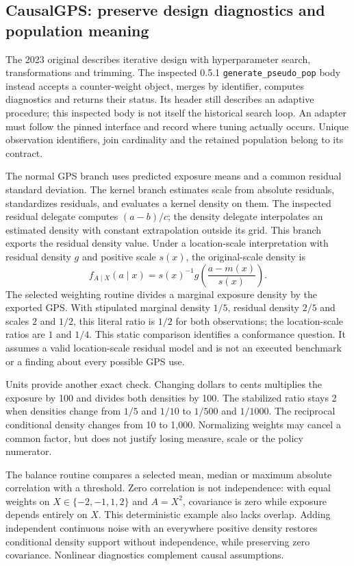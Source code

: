 \subsection{CausalGPS: preserve design diagnostics and population meaning}
The 2023 original describes iterative design with hyperparameter search,
transformations and trimming. The inspected 0.5.1
\texttt{generate\_pseudo\_pop} body instead accepts a counter-weight object,
merges by identifier, computes diagnostics and returns their status. Its header
still describes an adaptive procedure; this inspected body is not itself the
historical search loop. An adapter must follow the pinned interface and record
where tuning actually occurs. Unique observation identifiers, join cardinality
and the retained population belong to its contract.
\citep{exec24_dose_causalgps,exec24_dose_original}

The normal GPS branch uses predicted exposure means and a common residual
standard deviation. The kernel branch estimates scale from absolute residuals,
standardizes residuals, and evaluates a kernel density on them. The inspected
residual delegate computes $(a-b)/c$; the density delegate interpolates an
estimated density with constant extrapolation outside its grid. This branch
exports the residual density value. Under a location-scale interpretation with
residual density $g$ and positive scale $s(x)$, the original-scale density is
\[
 f_{A\mid X}(a\mid x)=s(x)^{-1}
 g\!\left(\frac{a-m(x)}{s(x)}\right).
\]
The selected weighting routine divides a marginal exposure density by the
exported GPS. With stipulated marginal density $1/5$, residual density $2/5$
and scales $2$ and $1/2$, this literal ratio is $1/2$ for both observations;
the location-scale ratios are $1$ and $1/4$. This static comparison identifies
a conformance question. It assumes a valid location-scale residual model and
is not an executed benchmark or a finding about every possible GPS use.
\citep{exec24_dose_causalgps,exec24_dose_contract}

Units provide another exact check. Changing dollars to cents multiplies the
exposure by 100 and divides both densities by 100. The stabilized ratio stays
2 when densities change from $1/5$ and $1/10$ to $1/500$ and $1/1000$.
The reciprocal conditional density changes from 10 to 1,000. Normalizing weights
may cancel a common factor, but does not justify losing measure, scale or the
policy numerator.~\citep{exec24_dose_contract}

The balance routine compares a selected mean, median or maximum absolute
correlation with a threshold. Zero correlation is not independence: with equal
weights on $X\in\{-2,-1,1,2\}$ and $A=X^2$, covariance is zero while exposure
depends entirely on $X$. This deterministic example also lacks overlap.
Adding independent continuous noise with an everywhere positive density
restores conditional density support without independence, while preserving
zero covariance. Nonlinear diagnostics complement causal assumptions.
\citep{exec24_dose_causalgps,exec24_dose_contract}

